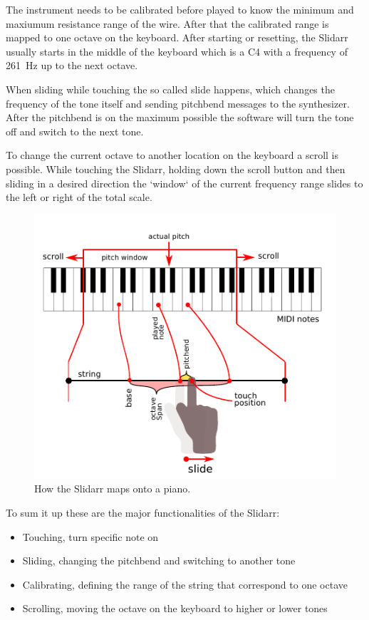 \documentclass{article}
\begin{document}
The instrument needs to be calibrated before played to know the minimum and maxiumum resistance range of the wire. After that the calibrated range is mapped to one octave on the keyboard. After starting or resetting, the Slidarr usually starts in the middle of the keyboard which is a C4 with a frequency of \SI{261}{\hertz} up to the next octave.

When sliding while touching the so called slide happens, which changes the frequency of the tone itself and sending pitchbend messages to the synthesizer. After the pitchbend is on the maximum possible the software will turn the tone off and switch to the next tone.

To change the current octave to another location on the keyboard a scroll is possible. While touching the Slidarr, holding down the scroll button and then sliding in a desired direction the `window` of the current frequency range slides to the left or right of the total scale.

\begin{figure}[ht]
  \centering
  \includegraphics[width=1\textwidth]{slidar_illustration}
  \caption{How the Slidarr maps onto a piano.}
  \label{fig:slidarr}
\end{figure}

To sum it up these are the major functionalities of the Slidarr:
\begin{itemize}
 \item Touching, turn specific note on
 \item Sliding, changing the pitchbend and switching to another tone
 \item Calibrating, defining the range of the string that correspond to one octave
 \item Scrolling, moving the octave on the keyboard to higher or lower tones
\end{itemize}
\end{document}
